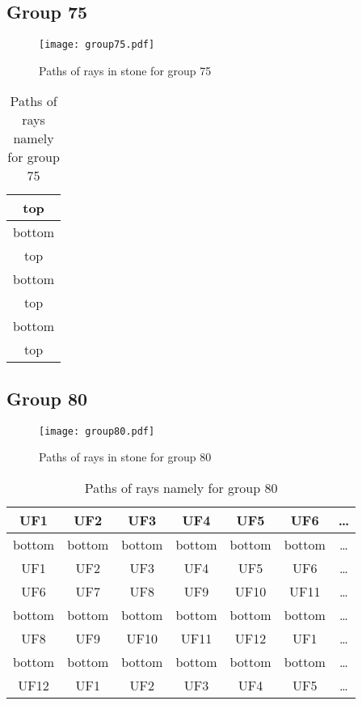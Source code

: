 \subsection*{Group 75}






\begin{figure}[h!]
\centering
\texttt{[image: group75.pdf]}
\caption{Paths of rays in stone for group 75}
\label{table:FigGroup75}
\end{figure}



\begin{table}[h!]
\centering
\begin{tabular}{|c|}
\hline
top \\
\hline
bottom \\
\hline
top \\
\hline
bottom \\
\hline
top \\
\hline
bottom \\
\hline
top \\
\hline
\end{tabular}
\caption{Paths of rays namely for group 75}
\label{table:TableGroup75}
\end{table}
\newpage
\subsection*{Group 80}






\begin{figure}[h!]
\centering
\texttt{[image: group80.pdf]}
\caption{Paths of rays in stone for group 80}
\label{table:FigGroup80}
\end{figure}



\begin{table}[h!]
\centering
\begin{tabular}{|c|c|c|c|c|c|c|}
\hline
UF1 & UF2 & UF3 & UF4 & UF5 & UF6 & \dots \\
\hline
bottom & bottom & bottom & bottom & bottom & bottom & \dots \\
\hline
UF1 & UF2 & UF3 & UF4 & UF5 & UF6 & \dots \\
\hline
UF6 & UF7 & UF8 & UF9 & UF10 & UF11 & \dots \\
\hline
bottom & bottom & bottom & bottom & bottom & bottom & \dots \\
\hline
UF8 & UF9 & UF10 & UF11 & UF12 & UF1 & \dots \\
\hline
bottom & bottom & bottom & bottom & bottom & bottom & \dots \\
\hline
UF12 & UF1 & UF2 & UF3 & UF4 & UF5 & \dots \\
\hline
\end{tabular}
\caption{Paths of rays namely for group 80}
\label{table:TableGroup80}
\end{table}
\newpage
